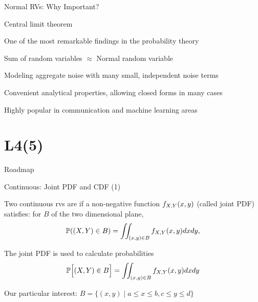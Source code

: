 \begin{frame}{Normal RVs: Why Important?}

\plitemsep 0.15in
\bci
\item Central limit theorem

\bci
\item  One of the most remarkable findings in the probability theory
\item  Sum of  random variables $\approx$ Normal random variable
\eci

\item Modeling aggregate noise with many small, independent noise terms

\item Convenient analytical properties, allowing closed forms in many cases

\item Highly popular in communication and machine learning areas
\eci
\end{frame}


\section{L4(5)}
\begin{frame}{Roadmap}

\plitemsep 0.1in
\bce[(1)]
\item {}

\item {}

\item {}

\item {}

\item {}

\item {}

\ece
\end{frame}


\begin{frame}{Continuous: Joint PDF and CDF (1)}

\mycolorbox
{
Two continuous rvs are  if a non-negative function $f_{X,Y}(x,y)$ (called joint PDF) satisfies: for  $B$ of the two dimensional plane,
$$
\mathbb{P}( (X,Y) \in B ) = \iint_{(x,y) \in B} f_{X,Y}(x,y) dx dy,
$$
\vspace{-0.3cm}
}

\plitemsep 0.1in
\bce
\item<3-> The joint PDF is used to calculate probabilities
$$\mathbb{P}\Bigl[ (X,Y) \in B \Bigr] = \iint_{(x,y) \in B} f_{X,Y}(x,y) dx dy$$

Our particular interest: $B = \{(x,y) \mid a \le x \le b, c \le y \le d \}$
\ece

\end{frame}

